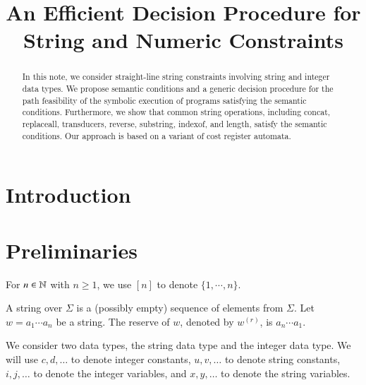 \documentclass{llncs}
\title{An Efficient Decision Procedure for\\
 String and Numeric Constraints}
\author{}
\institute{ }
\begin{document}
\maketitle

\begin{abstract}
In this note, we consider straight-line string constraints involving string and integer data types. 
We propose semantic conditions and a generic decision procedure for the path feasibility of the symbolic execution of programs satisfying the semantic conditions. 
Furthermore, we show that common string operations,  including concat, replaceall, transducers, reverse, substring, indexof, and length, satisfy the semantic conditions.
Our approach is based on a variant of cost register automata.
\end{abstract}

%
%

\section{Introduction}

\section{Preliminaries}

For $n \in \mathbb{N}$ with $n \ge 1$, we use $[n]$ to denote $\{1, \cdots, n\}$.

A string over $\Sigma$ is a (possibly empty) sequence of elements from $\Sigma$. Let $w=a_1\cdots a_n$ be a string. The reserve of $w$, denoted by $w^{(r)}$, is $a_n \cdots a_1$.

We consider two data types, the string data type and the integer data type. We will use $c, d,\dots$ to denote integer constants, $u, v, \dots$ to denote string constants,  $i, j, \dots$ to denote the  integer variables, and $x, y, \dots$ to denote the string variables.
\end{document}
